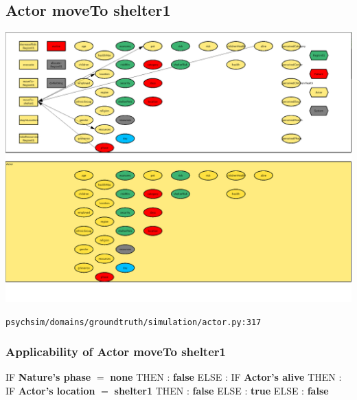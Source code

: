 \documentclass{article}%
\begin{document}
\subsection{Actor moveTo shelter1}%
\label{subsec:Actor moveTo shelter1}%
\includegraphics[width=\textwidth]{images/Actor-moveTo-shelter1.png}%
\begin{flushleft}%
\verb|psychsim/domains/groundtruth/simulation/actor.py:317|%
\end{flushleft}%
\subsubsection{Applicability of Actor moveTo shelter1}%
\label{ssubsec:Applicability of Actor moveTo shelter1}%
\begin{flushleft}%
IF %
\textbf{Nature's phase}%
$=$%
\textbf{none}%
\linebreak%
\hspace*{2em}%
THEN %
: %
\textbf{false}%
\linebreak%
\hspace*{2em}%
ELSE %
: %
IF %
\textbf{Actor's alive}%
\linebreak%
\hspace*{4em}%
THEN %
: %
IF %
\textbf{Actor's location}%
$=$%
\textbf{shelter1}%
\linebreak%
\hspace*{6em}%
THEN %
: %
\textbf{false}%
\linebreak%
\hspace*{6em}%
ELSE %
: %
\textbf{true}%
\linebreak%
\hspace*{4em}%
ELSE %
: %
\textbf{false}%
\end{flushleft}
\end{document}
